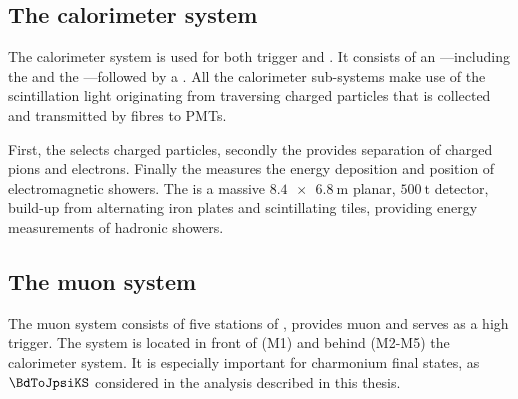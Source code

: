 \subsection{The calorimeter system}
\label{sec:lhcb_experiment:pid:calo}

The \LHCb calorimeter system is used for both trigger and \PID. It consists of
an \ECAL---including the \SPD and the \PS---followed by a \HCAL. All the
calorimeter sub-systems make use of the scintillation light originating from
traversing charged particles that is collected and transmitted by fibres to
\acp{PMT}.

First, the \SPD selects charged particles, secondly the \PS provides separation
of charged pions and electrons. Finally the \ECAL measures the energy deposition
and position of electromagnetic showers. The \HCAL is a massive
$\SI[product-units = power]{8.4 x 6.8}{\metre}$ planar, $\SI{500}{\tonne}$
detector, build-up from alternating iron plates and scintillating tiles,
providing energy measurements of hadronic showers.

\subsection{The muon system}
\label{sec:lhcb_experiment:pid:muon}

The muon system consists of five stations of \MWPC, provides muon \PID and
serves as a high \pT trigger. The system is located in front of (M1) and behind
(M2-M5) the calorimeter system. It is especially important for charmonium final
states, as $\BdToJpsiKS$ considered in the analysis described in this thesis.

